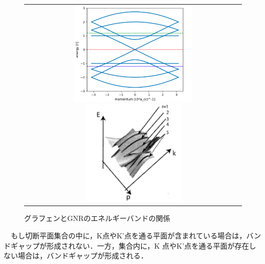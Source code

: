 \begin{figure}[H]
  \centering

  \begin{tabular}{c}
    \begin{minipage}{0.50\hsize}
    \centering
    \includegraphics[keepaspectratio, height=5cm]{./imgs/3.png}
    \caption{$N= 5$に対する$E(k)$}
    \end{minipage}

    \begin{minipage}{0.50\hsize}
    \centering
    \includegraphics[keepaspectratio, height=5cm]{./imgs/4.png}
    \caption{グラフェンとGNRのエネルギーバンドの関係}
    \end{minipage}
  \end{tabular}
\end{figure}

　もし切断平面集合の中に，K点やK’点を通る平面が含まれている場合は，バンドギャップが形成されない．一方，集合内に，K 点やK’点を通る平面が存在しない場合は，バンドギャップが形成される．

